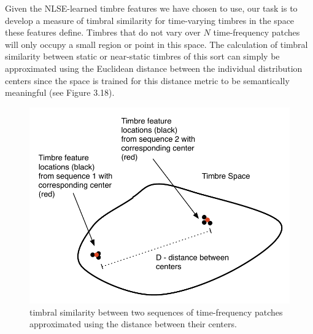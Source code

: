 \documentclass[12pt]{report} 	%
\numberwithin{figure}{chapter}
\numberwithin{table}{chapter}
\numberwithin{equation}{chapter}
\begin{document}
\begin{flushleft}
Given the NLSE-learned timbre features we have chosen to use, our task is to develop a measure of timbral similarity for time-varying timbres in the space these features define. Timbres that do not vary over $N$ time-frequency patches will only occupy a small region or point in this space. The calculation of timbral similarity between static or near-static timbres of this sort can simply be approximated using the Euclidean distance between the individual distribution centers since the space is trained for this distance metric to be semantically meaningful (see Figure 3.18). 
\begin{figure}[h!]
\begin{center}
\includegraphics[scale=0.8]{TimbreDistance1}
\caption[Timbre distance between centers]{timbral similarity between two sequences of time-frequency patches approximated using the distance between their centers.}
\end{center}
\end{figure}


\end{flushleft}
\end{document}
